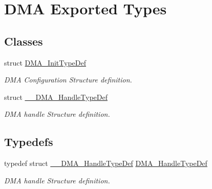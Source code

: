 \hypertarget{group___d_m_a___exported___types}{\section{D\-M\-A Exported Types}
\label{group___d_m_a___exported___types}
}
\subsection*{Classes}
\begin{DoxyCompactItemize}
\item 
struct \hyperlink{struct_d_m_a___init_type_def}{D\-M\-A\-\_\-\-Init\-Type\-Def}
\begin{DoxyCompactList}\small\item\em D\-M\-A Configuration Structure definition. \end{DoxyCompactList}\item 
struct \hyperlink{struct_____d_m_a___handle_type_def}{\-\_\-\-\_\-\-D\-M\-A\-\_\-\-Handle\-Type\-Def}
\begin{DoxyCompactList}\small\item\em D\-M\-A handle Structure definition. \end{DoxyCompactList}\end{DoxyCompactItemize}
\subsection*{Typedefs}
\begin{DoxyCompactItemize}
\item 
\hypertarget{group___d_m_a___exported___types_ga92b907d56a9c29b93d46782a7a04f91e}{typedef struct \hyperlink{struct_____d_m_a___handle_type_def}{\-\_\-\-\_\-\-D\-M\-A\-\_\-\-Handle\-Type\-Def} \hyperlink{group___d_m_a___exported___types_ga92b907d56a9c29b93d46782a7a04f91e}{D\-M\-A\-\_\-\-Handle\-Type\-Def}}\label{group___d_m_a___exported___types_ga92b907d56a9c29b93d46782a7a04f91e}

\begin{DoxyCompactList}\small\item\em D\-M\-A handle Structure definition. \end{DoxyCompactList}\end{DoxyCompactItemize}
